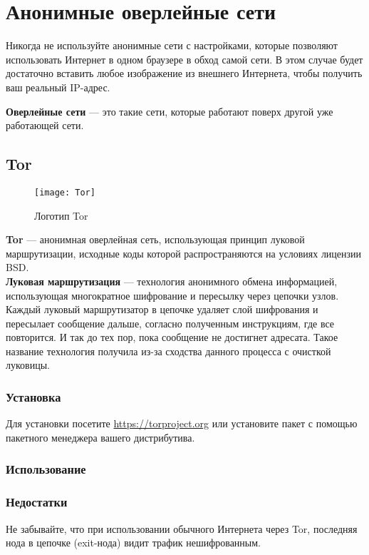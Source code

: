 \section{Анонимные оверлейные сети}
\begin{important}
Никогда не используйте анонимные сети с настройками, которые позволяют использовать Интернет в одном браузере в обход самой сети. В этом случае будет достаточно вставить любое изображение из внешнего Интернета, чтобы получить ваш реальный IP-адрес.
\end{important}
\textbf{Оверлейные сети} --- это такие сети, которые работают поверх другой уже работающей сети.
\subsection{Tor}
\begin{wrapfigure}[9]{r}{0.25\linewidth}
\texttt{[image: Tor]}
\caption{Логотип Tor}
\end{wrapfigure}
\textbf{Tor} --- анонимная оверлейная сеть, использующая принцип луковой маршрутизации, исходные коды которой распространяются на условиях лицензии BSD\cite{tor_license}.\\
\textbf{Луковая маршрутизация} --- технология анонимного обмена информацией, использующая многократное шифрование и пересылку через цепочки узлов. Каждый луковый маршрутизатор в цепочке удаляет слой шифрования и пересылает сообщение дальше, согласно полученным инструкциям, где все повторится. И так до тех пор, пока сообщение не достигнет адресата. Такое название технология получила из-за сходства данного процесса с очисткой луковицы.\\
\subsubsection{Установка}
Для установки посетите \url{https://torproject.org} или установите пакет с помощью пакетного менеджера вашего дистрибутива.
\subsubsection{Использование}
\subsubsection{Недостатки}
\begin{important}
Не забывайте, что при использовании обычного Интернета через Tor, последняя нода в цепочке (exit-нода) видит трафик нешифрованным.
\end{important}
